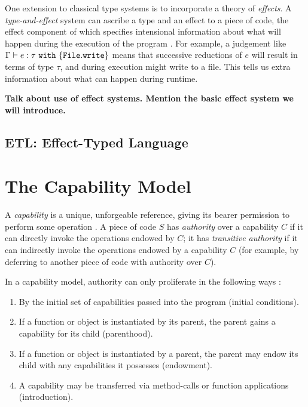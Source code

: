 One extension to classical type systems is to incorporate a theory of \textit{effects}. A \textit{type-and-effect} system can ascribe a type and an effect to a piece of code, the effect component of which specifies intensional information about what will happen during the execution of the program \cite{nielson99}. For example, a judgement like $\Gamma \vdash e: \tau~\mathtt{with}~ \{ \mathtt{File.write} \}$ means that successive reductions of $e$ will result in terms of type $\tau$, and during execution might write to a file. This tells us extra information about what can happen during runtime.

\textbf{Talk about use of effect systems. Mention the basic effect system we will introduce.}

\subsection{ETL: Effect-Typed Language}




\section{The Capability Model}

A \textit{capability} is a unique, unforgeable reference, giving its bearer permission to perform some operation \cite{dennis66}. A piece of code $S$ has \textit{authority} over a capability $C$ if it can directly invoke the operations endowed by $C$; it has \textit{transitive authority} if it can indirectly invoke the operations endowed by a capability $C$ (for example, by deferring to another piece of code with authority over $C$).

In a capability model, authority can only proliferate in the following ways \cite{miller06}:

\begin{enumerate}
	\item By the initial set of capabilities passed into the program (initial conditions).
	\item If a function or object is instantiated by its parent, the parent gains a capability for its child (parenthood).
	\item If a function or object is instantiated by a parent, the parent may endow its child with any capabilities it possesses (endowment).
	\item A capability may be transferred via method-calls or function applications (introduction).
\end{enumerate}

